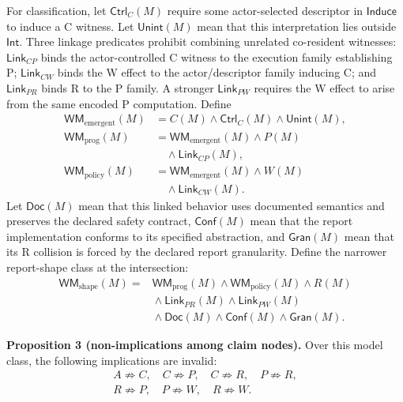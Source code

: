 \documentclass[conference]{IEEEtran}
\begin{document}
For classification, let $\mathsf{Ctrl}_C(M)$ require some actor-selected descriptor in $\mathsf{Induce}$ to induce a C witness. Let $\mathsf{Unint}(M)$ mean that this interpretation lies outside $\mathsf{Int}$. Three linkage predicates prohibit combining unrelated co-resident witnesses: $\mathsf{Link}_{CP}$ binds the actor-controlled C witness to the execution family establishing P; $\mathsf{Link}_{CW}$ binds the W effect to the actor/descriptor family inducing C; and $\mathsf{Link}_{PR}$ binds R to the P family. A stronger $\mathsf{Link}_{PW}$ requires the W effect to arise from the same encoded P computation. Define
\begin{equation}
\begin{aligned}
\mathsf{WM}_{\mathrm{emergent}}(M)
&=C(M)\land\mathsf{Ctrl}_C(M)\land\mathsf{Unint}(M),\\
\mathsf{WM}_{\mathrm{prog}}(M)
&=\mathsf{WM}_{\mathrm{emergent}}(M)\land P(M)\\
&\quad{}\land\mathsf{Link}_{CP}(M),\\
\mathsf{WM}_{\mathrm{policy}}(M)
&=\mathsf{WM}_{\mathrm{emergent}}(M)\land W(M)\\
&\quad{}\land\mathsf{Link}_{CW}(M).
\end{aligned}
\end{equation}
Let $\mathsf{Doc}(M)$ mean that this linked behavior uses documented semantics and preserves the declared safety contract, $\mathsf{Conf}(M)$ mean that the report implementation conforms to its specified abstraction, and $\mathsf{Gran}(M)$ mean that its R collision is forced by the declared report granularity. Define the narrower report-shape class at the intersection:
\begin{equation}
\begin{aligned}
\mathsf{WM}_{\mathrm{shape}}(M)={}&\mathsf{WM}_{\mathrm{prog}}(M)
\land\mathsf{WM}_{\mathrm{policy}}(M)\land R(M)\\
&{}\land\mathsf{Link}_{PR}(M)\land\mathsf{Link}_{PW}(M)\\
&{}\land\mathsf{Doc}(M)\land\mathsf{Conf}(M)\land\mathsf{Gran}(M).
\end{aligned}
\end{equation}

\medskip
\noindent\textbf{Proposition 3 (non-implications among claim nodes).}
Over this model class, the following implications are invalid:
\begin{equation}
\begin{gathered}
A\not\Rightarrow C,\quad
C\not\Rightarrow P,\quad
C\not\Rightarrow R,\quad
P\not\Rightarrow R,\\
R\not\Rightarrow P,\quad
P\not\Rightarrow W,\quad
R\not\Rightarrow W.
\end{gathered}
\end{equation}
\end{document}
